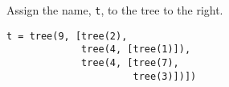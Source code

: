 \begin{blocksection}
\question Assign the name, \lstinline$t$, to the tree to the right.

\begin{solution}[1.5in]
\begin{lstlisting}
t = tree(9, [tree(2),
             tree(4, [tree(1)]),
             tree(4, [tree(7),
                      tree(3)])])
\end{lstlisting}
\end{solution}
\end{blocksection}
